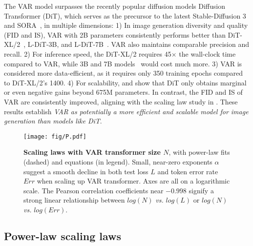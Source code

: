 \vspace{1pt}
The VAR model surpasses the recently popular diffusion models Diffusion Transformer (DiT), which serves as the precursor to the latest Stable-Diffusion 3~\cite{stable-diffusion3} and SORA~\cite{sora}, in multiple dimensions:
1) In image generation diversity and quality (FID and IS), VAR with 2B parameters consistently performs better than DiT-XL/2~\cite{dit}, L-DiT-3B, and L-DiT-7B~\cite{dit-github}. VAR also maintains comparable precision and recall.
2) For inference speed, the DiT-XL/2 requires 45$\times$ the wall-clock time compared to VAR, while 3B and 7B models~\cite{dit-github} would cost much more.
3) VAR is considered more data-efficient, as it requires only 350 training epochs compared to DiT-XL/2's 1400.
4) For scalability,  and  show that DiT only obtains marginal or even negative gains beyond 675M parameters.
In contrast, the FID and IS of VAR are consistently improved, aligning with the scaling law study in .
These results establish \textit{VAR as potentially a more efficient and scalable model for image generation than models like DiT}.

\vspace{4pt}
\begin{figure}[th]
\begin{center}
\texttt{[image: fig/P.pdf]}
\end{center}
\vspace{-2pt}
\caption{\small
\textbf{Scaling laws with VAR transformer size $N$}, with power-law fits (dashed) and equations (in legend).
Small, near-zero exponents $\alpha$ suggest a smooth decline in both test loss $L$ and token error rate $Err$ when scaling up VAR transformer.
Axes are all on a logarithmic scale.
The Pearson correlation coefficients near $-0.998$ signify a strong linear relationship between $log(N)$ \textit{vs.} $log(L)$ or $log(N)$ \textit{vs.} $log(Err)$.
\vspace{-6pt}
}
\label{fig:P}
\end{figure}

\vspace{4pt}
\subsection{Power-law scaling laws} \label{sec:law}

